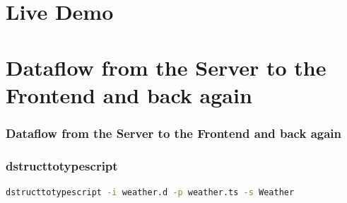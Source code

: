 \documentclass[xelatex,13pt]{beamer}
\begin{document}
\section{Live Demo}

\section{Dataflow from the Server to the Frontend and back again}
\begin{frame}
	\frametitle{Dataflow from the Server to the Frontend and back again}
	
	\pause
	
\end{frame}

\begin{frame}[fragile]
	\frametitle{dstructtotypescript}
\begin{lstlisting}[numbers=none,language=bash]
dstructtotypescript -i weather.d -p weather.ts -s Weather
\end{lstlisting}
\pause
\begin{figure}[h]
	
\end{figure}
\end{frame}
\end{document}
